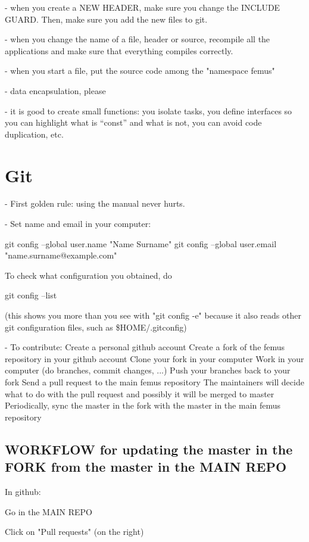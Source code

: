 \documentclass[10pt]{book}
\begin{document}
 - when you create a NEW HEADER, make sure you change the INCLUDE GUARD.
 Then, make sure you add the new files to git.
 
 - when you change the name of a file, header or source, recompile all the applications
   and make sure that everything compiles correctly.
   
 - when you start a file, put the source code among the "namespace femus"

 - data encapsulation, please
 
 - it is good to create small functions: you isolate tasks, 
   you define interfaces so you can highlight what is ``const'' and what is not,
   you can avoid code duplication, etc.
   
 
\chapter{Git}


- First golden rule: using the manual never hurts.

- Set name and email in your computer:

  git config --global user.name "Name Surname"
  git config --global user.email "name.surname@example.com"

  To check what configuration you obtained, do 

  git config --list 

  (this shows you more than you see with "git config -e"
  because it also reads other git configuration files,
  such as \$HOME/.gitconfig)

- To contribute:
  Create a personal github account 
  Create a fork of the femus repository in your github account
  Clone your fork in your computer
  Work in your computer (do branches, commit changes, ...)
  Push your branches back to your fork 
  Send a pull request to the main femus repository
  The maintainers will decide what to do with the pull request and possibly it will be merged to master
  Periodically, sync the master in the fork with the master in the main femus repository


\section{WORKFLOW for updating the master in the FORK from the master in the MAIN REPO}


In github:

Go in the MAIN REPO

Click on "Pull requests" (on the right)
\end{document}
